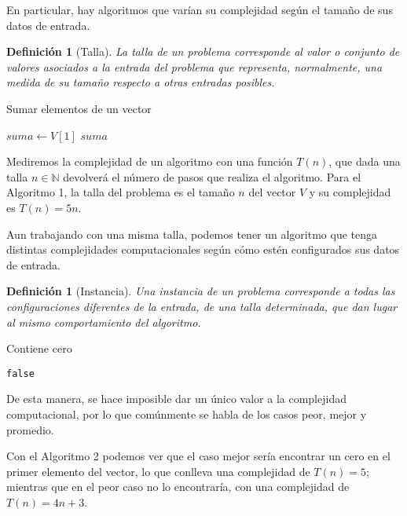 \documentclass[12pt,twoside]{article}
\newtheorem{definition}[theorem]{Definición}
\begin{document}
En particular, hay algoritmos que varían su complejidad según el tamaño de sus datos de entrada.

\begin{definition}[Talla]
    La talla de un problema corresponde al valor o conjunto de valores asociados a la entrada del problema que representa, normalmente, una medida de su tamaño respecto a otras entradas posibles.
\end{definition}

\begin{algorithm}[H]
\DontPrintSemicolon
\SetAlgoLined
\caption{Sumar elementos de un vector}
\BlankLine
$suma \gets V[1]$\; 
\Return $suma$\;
\end{algorithm}

\hspace{5mm}

Mediremos la complejidad de un algoritmo con una función $T(n)$, que dada una talla $n\in\mathbb{N}$ devolverá el número de pasos que realiza el algoritmo. Para el Algoritmo 1, la talla del problema es el tamaño $n$ del vector $V$ y su complejidad es $T(n)=5n$.

Aun trabajando con una misma talla, podemos tener un algoritmo que tenga distintas complejidades computacionales según cómo estén configurados sus datos de entrada.

\begin{definition}[Instancia]
    Una instancia de un problema corresponde a todas las configuraciones diferentes de la entrada, de una talla determinada, que dan lugar al mismo comportamiento del algoritmo.
\end{definition}


\begin{algorithm}
\DontPrintSemicolon
\SetAlgoLined
\caption{Contiene cero}
\Return \texttt{false}
\end{algorithm}


De esta manera, se hace imposible dar un único valor a la complejidad computacional, por lo que comúnmente se habla de los casos peor, mejor y promedio.

Con el Algoritmo 2 podemos ver que el caso mejor sería encontrar un cero en el primer elemento del vector, lo que conlleva una complejidad de $T(n)=5$; mientras que en el peor caso no lo encontraría, con una complejidad de $T(n)=4n+3$.
\end{document}
